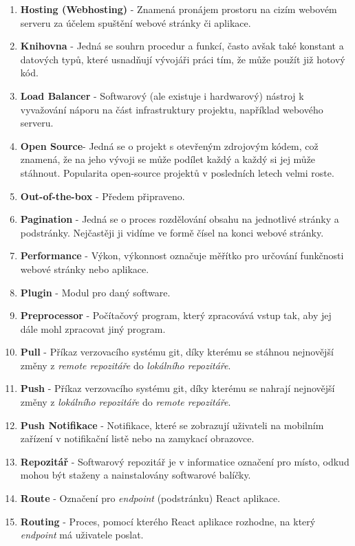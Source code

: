 \documentclass[12pt,a4paper]{report}
\begin{document}
\begin{enumerate}
    \item \textbf{Hosting (Webhosting)} - Znamená pronájem prostoru na cizím webovém serveru za účelem spuštění webové stránky či aplikace. 
    \item \textbf{Knihovna} - Jedná se souhrn procedur a funkcí, často avšak také konstant a datových typů, které usnadňují vývojáři práci tím, že může použít již hotový kód.
    \item \textbf{Load Balancer} - Softwarový (ale existuje i hardwarový) nástroj k vyvažování náporu na část infrastruktury projektu, například webového serveru.
    \item \textbf{Open Source}- Jedná se o projekt s otevřeným zdrojovým kódem, což znamená, že na jeho vývoji se může podílet každý a každý si jej může stáhnout. Popularita open-source projektů v posledních letech velmi roste.
    \item \textbf{Out-of-the-box} - Předem připraveno. 
    \item \textbf{Pagination} - Jedná se o proces rozdělování obsahu na jednotlivé stránky a podstránky. Nejčastěji ji vidíme ve formě čísel na konci webové stránky.
    \item \textbf{Performance} - Výkon, výkonnost označuje měřítko pro určování funkčnosti webové stránky nebo aplikace.
    \item \textbf{Plugin} - Modul pro daný software.
    \item \textbf{Preprocessor} - Počítačový program, který zpracovává vstup tak, aby jej dále mohl zpracovat jiný program.
    \item \textbf{Pull} - Příkaz verzovacího systému git, díky kterému se stáhnou nejnovější změny z \emph{remote repozitáře} do \emph{lokálního repozitáře}.
    \item \textbf{Push} - Příkaz verzovacího systému git, díky kterému se nahrají nejnovější změny z \emph{lokálního repozitáře} do \emph{remote repozitáře}.
    \item \textbf{Push Notifikace}  - Notifikace, které se zobrazují uživateli na mobilním zařízení v notifikační listě nebo na zamykací obrazovce.
    \item \textbf{Repozitář} - Softwarový repozitář je v informatice označení pro místo, odkud mohou být staženy a nainstalovány softwarové balíčky.
    \item \textbf{Route} - Označení pro \emph{endpoint} (podstránku) React aplikace.
    \item \textbf{Routing} - Proces, pomocí kterého React aplikace rozhodne, na který \emph{endpoint} má uživatele poslat.

\end{enumerate}
\end{document}
